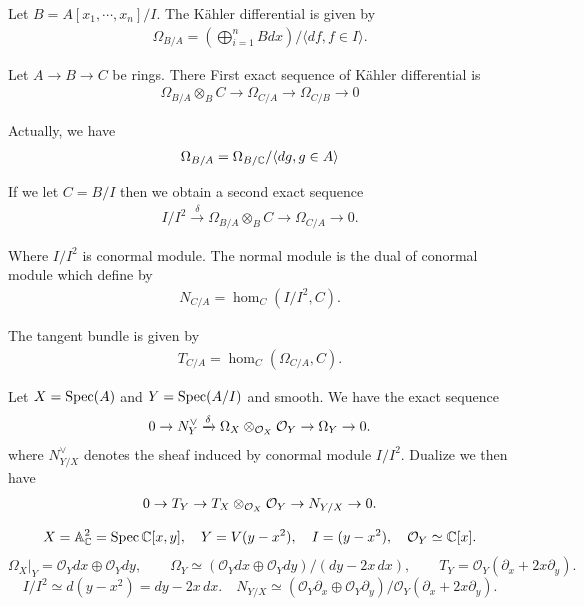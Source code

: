 {\np Let $B = A[x_1,\cdots,x_n]/I$. The Kähler differential is given by 
\begin{align*}
    \Omega_{B/A} = \left(\bigoplus_{i=1}^n B dx\right)/\langle df,f\in I \rangle.
\end{align*}



\np Let $A\to B\to C$ be rings. There First exact sequence of Kähler differential is 
\begin{align*}
    \Omega_{B/A}\otimes_B C \to \Omega_{C/A} \to  \Omega_{C/B} \to 0
\end{align*}

Actually, we have 
\begin{align*}
    \Omega_{B/A} = \Omega_{B/\mathbb{C}}/\langle dg,g\in A \rangle 
\end{align*}

If we let $C=B/I$ then we obtain a second exact sequence 
\begin{align*}
    I/I^2 \xrightarrow{\delta} \Omega_{B/A}\otimes_B C \to \Omega_{C/A} \to 0.
\end{align*}

Where $I/I^2$ is conormal module. The normal module is the dual of conormal module which define by 
\begin{align*}
    N_{C/A} = \hom_{C}(I/I^2,C).
\end{align*}

The tangent bundle is given by 
\begin{align*}
    T_{C/A} = \hom_{C}(\Omega_{C/A},C).
\end{align*}

Let $X=\operatorname{Spec}(A)$ and $Y=\operatorname{Spec}(A/I)$ and smooth.
We have the exact sequence 
\begin{align*}
    0\to N^\vee _Y \xrightarrow{\delta} \Omega_{X}\otimes_{\mathcal{O}_X} \mathcal{O}_Y \to \Omega_{Y} \to 0.
\end{align*}
where $N^\vee _{Y/X}$ denotes the sheaf induced by conormal module $I/I^2$. Dualize we then have 
\begin{align*}
    0\to T_Y \to  T_X\otimes_{\mathcal{O}_X} \mathcal{O}_Y \to N_{Y/X} \to 0.
\end{align*}

\[
X=\mathbb A^2_{\mathbb C}=\operatorname{Spec}\mathbb C[x,y],\quad Y=V(y-x^2),\quad I=(y-x^2),\quad \mathcal O_Y\simeq\mathbb C[x].
\]
\[
\Omega_X|_Y=\mathcal O_Ydx\oplus\mathcal O_Ydy,\qquad 
\Omega_Y\simeq(\mathcal O_Ydx\oplus\mathcal O_Ydy)/(dy-2x\,dx),\qquad T_Y=\mathcal O_Y\left(\partial_x+2x\partial_y\right).
\]
\[
I/I^2\simeq d(y-x^2)=dy-2x\,dx. \quad 
N_{Y/X}\simeq
(\mathcal O_Y\partial_x\oplus\mathcal O_Y\partial_y)/
\mathcal O_Y(\partial_x+2x\partial_y).
\]

}
